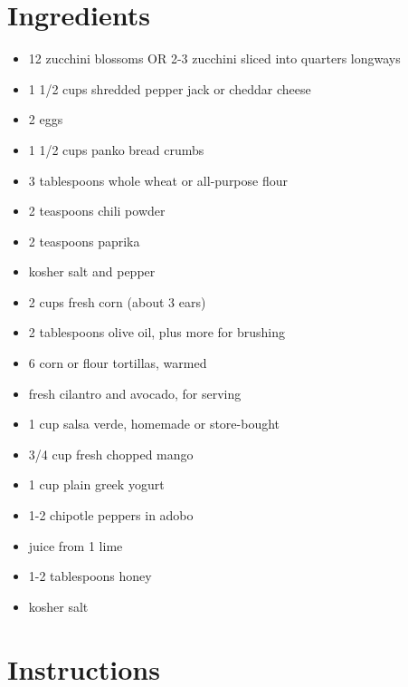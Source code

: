 \documentclass[
  letterpaper,
  DIV=11,
  numbers=noendperiod,
  titlepage=false]{scrreprt}
\providecommand{\tightlist}{%
  \setlength{\itemsep}{0pt}\setlength{\parskip}{0pt}}\usepackage{longtable,booktabs,array}
\begin{document}
\section{Ingredients}\label{ingredients-97}

\begin{itemize}
\tightlist
\item
  12 zucchini blossoms OR 2-3 zucchini sliced into quarters longways
\item
  1 1/2 cups shredded pepper jack or cheddar cheese
\item
  2 eggs
\item
  1 1/2 cups panko bread crumbs
\item
  3 tablespoons whole wheat or all-purpose flour
\item
  2 teaspoons chili powder
\item
  2 teaspoons paprika
\item
  kosher salt and pepper
\item
  2 cups fresh corn (about 3 ears)
\item
  2 tablespoons olive oil, plus more for brushing
\item
  6 corn or flour tortillas, warmed
\item
  fresh cilantro and avocado, for serving
\item
  1 cup salsa verde, homemade or store-bought
\item
  3/4 cup fresh chopped mango
\item
  1 cup plain greek yogurt
\item
  1-2 chipotle peppers in adobo
\item
  juice from 1 lime
\item
  1-2 tablespoons honey
\item
  kosher salt
\end{itemize}

\section{Instructions}\label{instructions-97}
\end{document}
